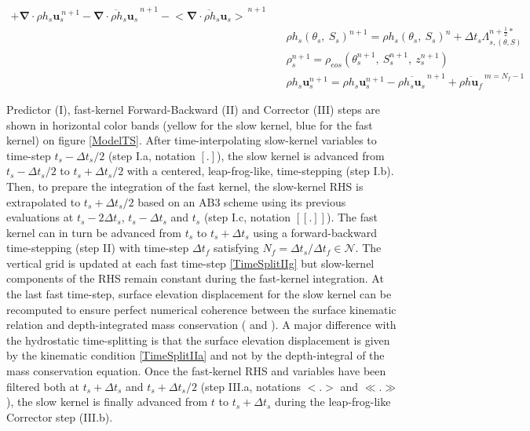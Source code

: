 \begin{table}
\begin{subequations}
\begin{alignat}{3}
 +\mathbf{\nabla}\cdot\rho h_s \mathbf{u}_s^{\ n+1}
 -\overline{\mathbf{\nabla}\cdot\rho h_s \mathbf{u}_s}^{\ n+1}
 -\overline{<\mathbf{\nabla}\cdot\rho h_s \mathbf{u}_s>}^{\ n+1}\\[3mm]
 \label{TimeSplitIIIb3}
 &\quad\rho h_s(\theta_s,\ S_s)^{n+1}=
 \rho h_s(\theta_s,\ S_s)^{n}
 +\Delta t_s\Lambda_{s,(\theta,S)}^{n+\frac{1}{2}*}\\[0mm]
 \label{TimeSplitIIIb4}
 &\quad\rho_s^{n+1}=\rho_{eos}\left(\theta_s^{n+1},\ S_s^{n+1},\ z_s^{n+1}\right)\\[0mm]
 \label{TimeSplitIIIb5}
 &\quad\rho h_s\mathbf{u}_s^{n+1}=\rho h_s\mathbf{u}_s^{n+1}
 -\overline{\rho h_s\mathbf{u}_s}^{\ n+1}
 +\overline{\rho h\mathbf{u}_f}^{\ m=N_f-1}
\end{alignat}
\end{subequations}
\end{table}
Predictor (I), fast-kernel Forward-Backward (II) and Corrector (III) steps are shown in horizontal color bands (yellow for the slow kernel, blue for the fast kernel) on figure \ref{ModelTS}. After time-interpolating slow-kernel variables to time-step $t_s-\Delta t_s/2$ (step I.a, notation $[.]$), the slow kernel is advanced from $t_s-\Delta t_s/2$ to $t_s+\Delta t_s/2$ with a centered, leap-frog-like, time-stepping (step I.b). Then, to prepare the integration of the fast kernel, the slow-kernel RHS is extrapolated to $t_s+\Delta t_s/2$ based on an AB3 scheme using its previous evaluations at $t_s-2\Delta t_s$, $t_s-\Delta t_s$ and $t_s$ (step I.c, notation $[[.]]$). The fast kernel can in turn be advanced from $t_s$ to $t_s+\Delta t_s$ using a forward-backward time-stepping (step II) with time-step $\Delta t_f$ satisfying  $N_f=\Delta t_s/\Delta t_f\in\mathcal{N}$. The vertical grid is updated at each fast time-step \ref{TimeSplitIIg} but slow-kernel components of the RHS remain constant during the fast-kernel integration. At the last fast time-step, surface elevation displacement for the slow kernel can be recomputed to ensure perfect numerical coherence between the surface kinematic relation and depth-integrated mass conservation ( and ). 
A major difference with the hydrostatic time-splitting is that the surface elevation displacement is given by the kinematic condition \ref{TimeSplitIIa} and not by the depth-integral of the mass conservation equation. Once the fast-kernel RHS and variables have been filtered both at $t_s+\Delta t_s$ and $t_s+\Delta t_s/2$ (step III.a, notations $<.>$ and $\ll.\gg$), the slow kernel is finally advanced from $t$ to  $t_s+\Delta t_s$ during the leap-frog-like Corrector step (III.b).\\

